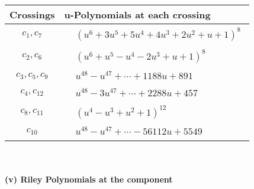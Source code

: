 \documentclass[1p]{elsarticle_modified}
\theoremstyle{definition}
\begin{document}
\begin{tabular}{m{50pt}|m{274pt}}
Crossings & \hspace{64pt}u-Polynomials at each crossing \\
\hline $$\begin{aligned}c_{1},c_{7}\end{aligned}$$&$\begin{aligned}
&(u^6+3 u^5+5 u^4+4 u^3+2 u^2+u+1)^8
\end{aligned}$\\
\hline $$\begin{aligned}c_{2},c_{6}\end{aligned}$$&$\begin{aligned}
&(u^6+u^5- u^4-2 u^3+u+1)^8
\end{aligned}$\\
\hline $$\begin{aligned}c_{3},c_{5},c_{9}\end{aligned}$$&$\begin{aligned}
&u^{48}- u^{47}+\cdots+1188 u+891
\end{aligned}$\\
\hline $$\begin{aligned}c_{4},c_{12}\end{aligned}$$&$\begin{aligned}
&u^{48}-3 u^{47}+\cdots+2288 u+457
\end{aligned}$\\
\hline $$\begin{aligned}c_{8},c_{11}\end{aligned}$$&$\begin{aligned}
&(u^4- u^3+u^2+1)^{12}
\end{aligned}$\\
\hline $$\begin{aligned}c_{10}\end{aligned}$$&$\begin{aligned}
&u^{48}- u^{47}+\cdots-56112 u+5549
\end{aligned}$\\
\hline
\end{tabular}\\~\\
\newpage\renewcommand{\arraystretch}{1}
\flushleft \textbf{(v) Riley Polynomials at the component}\newline \\
\end{document}
